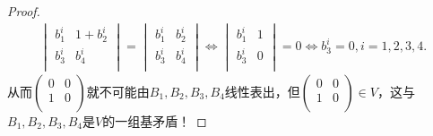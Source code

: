 \documentclass[../../main.tex]{subfiles}%
\begin{document}
\begin{proof}
\begin{align*}
\begin{vmatrix}
b_{1}^{i}&		1+b_{2}^{i}\\
b_{3}^{i}&		b_{4}^{i}\\
\end{vmatrix}=\begin{vmatrix}
b_{1}^{i}&		b_{2}^{i}\\
b_{3}^{i}&		b_{4}^{i}\\
\end{vmatrix}
\Longleftrightarrow \begin{vmatrix}
b_{1}^{i}&		1\\
b_{3}^{i}&		0\\
\end{vmatrix}=0\Longleftrightarrow b_{3}^{i}=0,i=1,2,3,4.
\end{align*}
从而$\begin{pmatrix}
0&		0\\
1&		0\\
\end{pmatrix}$就不可能由$B_1,B_2,B_3,B_4$线性表出，但$\begin{pmatrix}
0&		0\\
1&		0\\
\end{pmatrix} \in V$，这与$B_1,B_2,B_3,B_4$是$V$的一组基矛盾！

\end{proof}
\end{document}
